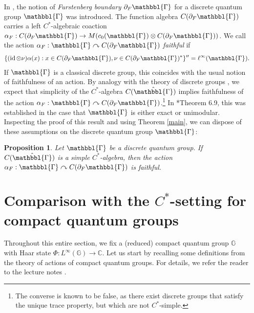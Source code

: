 \documentclass[reqno]{amsart}
\numberwithin{equation}{section}
\newtheorem{Prop}[Theorem]{Proposition}
\DeclareMathOperator{\id}{\mathrm{id}}
\newcommand{\G}{\mathbb{G}}
\begin{document}
In \cite{KKSV22}, the notion of \emph{Furstenberg boundary} $\partial_F \mathbbl{\Gamma}$ for a discrete quantum group $\mathbbl{\Gamma}$ was introduced. The function algebra $C(\partial_F \mathbbl{\Gamma})$ carries a left $C^*$-algebraic coaction $\alpha_F: C(\partial_F\mathbbl{\Gamma})\to M(c_0(\mathbbl{\Gamma})\otimes C(\partial_F\mathbbl{\Gamma}))$. We call the action $\alpha_F: \mathbbl{\Gamma}\curvearrowright C(\partial_F \mathbbl{\Gamma})$ \emph{faithful} if $$\{(\id \otimes \nu)\alpha(x): x \in C(\partial_F\mathbbl{\Gamma}), \nu \in C(\partial_F \mathbbl{\Gamma})^*\}''= \ell^\infty(\mathbbl{\Gamma}).$$
If $\mathbbl{\Gamma}$ is a classical discrete group, this coincides with the usual notion of faithfulness of an action.
By analogy with the theory of discrete groups \cite{BKKO17}, we expect that simplicity of the $C^*$-algebra $C(\hat{\mathbbl{\Gamma}})$ implies faithfulness of the action $\alpha_F: \mathbbl{\Gamma}\curvearrowright C(\partial_F\mathbbl{\Gamma})$.\footnote{The converse is known to be false, as there exist discrete groups that satisfy the unique trace property, but which are not $C^*$-simple.} In \cite{AK24}*{Theorem 6.9}, this was established in the case that $\mathbbl{\Gamma}$ is either exact or unimodular. Inspecting the proof of this result and using Theorem \ref{main}, we can dispose of these assumptions on the discrete quantum group $\mathbbl{\Gamma}$:
\begin{Prop}
    Let $\mathbbl{\Gamma}$ be a discrete quantum group. If $C(\hat{\mathbbl{\Gamma}})$ is a simple $C^*$-algebra, then the action $\alpha_F: \mathbbl{\Gamma}\curvearrowright C(\partial_F \mathbbl{\Gamma})$ is faithful.
\end{Prop}

\section{Comparison with the $C^*$-setting for compact quantum groups}

Throughout this entire section, we fix a (reduced) compact quantum group $\G$ with Haar state $\Phi: L^\infty(\G)\to \mathbb{C}$. Let us start by recalling some definitions from the theory of actions of compact quantum groups. For details, we refer the reader to the lecture notes \cite{DC17}. 
\end{document}
